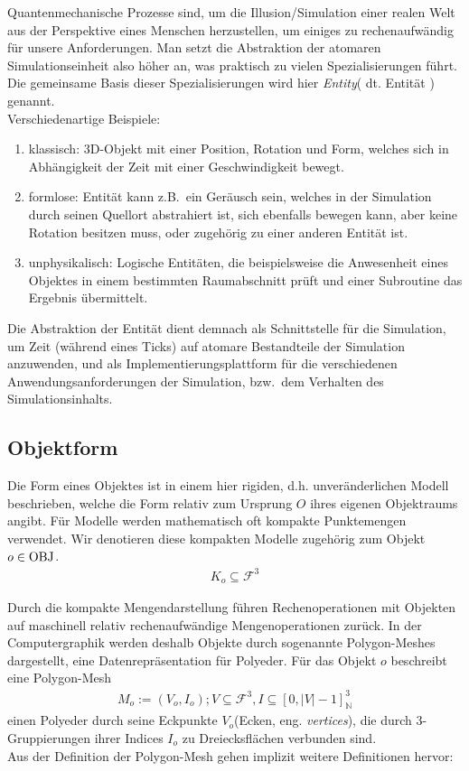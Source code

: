 Quantenmechanische Prozesse sind, um die Illusion/Simulation einer realen Welt aus der Perspektive eines Menschen herzustellen, um einiges zu rechenaufwändig für unsere Anforderungen. Man setzt die Abstraktion der atomaren Simulationseinheit also höher an, was praktisch zu vielen Spezialisierungen führt. Die gemeinsame Basis dieser Spezialisierungen wird hier \textit{Entity}( dt. Entität ) genannt.\\

Verschiedenartige Beispiele:
\begin{enumerate}
\item klassisch: 3D-Objekt mit einer Position, Rotation und Form, welches sich in Abhängigkeit der Zeit mit einer Geschwindigkeit bewegt.
\item formlose: Entität kann z.B.~ein Geräusch sein, welches in der Simulation durch seinen Quellort abstrahiert ist, sich ebenfalls bewegen kann, aber keine Rotation besitzen muss, oder zugehörig zu einer anderen Entität ist.
\item unphysikalisch: Logische Entitäten, die beispielsweise die Anwesenheit eines Objektes in einem bestimmten Raumabschnitt prüft und einer Subroutine das Ergebnis übermittelt.
\end{enumerate}
Die Abstraktion der Entität dient demnach als Schnittstelle für die Simulation, um Zeit (während eines Ticks) auf atomare Bestandteile der Simulation anzuwenden, und als Implementierungsplattform für die verschiedenen Anwendungsanforderungen der Simulation, bzw.~dem Verhalten des Simulationsinhalts.\\

\subsection{Objektform}
\label{sec:object_form}
Die Form eines Objektes ist in einem hier rigiden, d.h. unveränderlichen Modell beschrieben, welche die Form relativ zum Ursprung $O$ ihres eigenen Objektraums angibt.
Für Modelle werden mathematisch oft kompakte Punktemengen verwendet. Wir denotieren diese kompakten Modelle zugehörig zum Objekt $o \in \operatorname{OBJ}$.
\begin{align}
K_o \subseteq \mathcal{F}^3
\end{align}

Durch die kompakte Mengendarstellung führen Rechenoperationen mit Objekten auf maschinell relativ rechenaufwändige Mengenoperationen zurück. In der Computergraphik werden deshalb Objekte durch sogenannte Polygon-Meshes dargestellt, eine Datenrepräsentation für Polyeder. 
Für das Objekt $o$ beschreibt eine Polygon-Mesh 
\begin{align}
M_o := (V_o, I_o); V \subseteq \mathcal{F}^3, I \subseteq [0, |V|-1]_\mathbb{N}^3 
\end{align}
einen Polyeder durch seine Eckpunkte $V_o$(Ecken, eng. \textit{vertices}), die durch 3-Gruppierungen ihrer Indices $I_o$ zu Dreiecksflächen verbunden sind.\\
Aus der Definition der Polygon-Mesh gehen implizit weitere Definitionen hervor:

